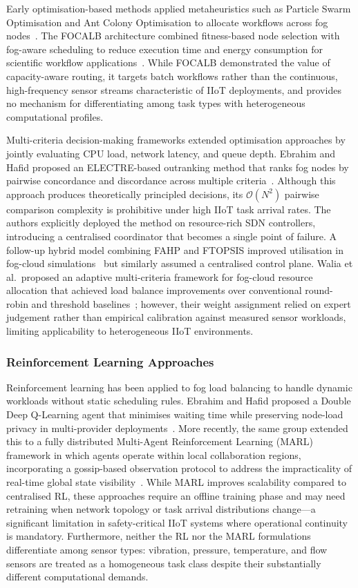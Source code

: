 \documentclass[conference]{IEEEtran}
\begin{document}
Early optimisation-based methods applied metaheuristics such as Particle Swarm Optimisation and Ant Colony Optimisation to allocate workflows across fog nodes~\cite{tripathy2026}. The FOCALB architecture combined fitness-based node selection with fog-aware scheduling to reduce execution time and energy consumption for scientific workflow applications~\cite{kaur2021}. While FOCALB demonstrated the value of capacity-aware routing, it targets batch workflows rather than the continuous, high-frequency sensor streams characteristic of IIoT deployments, and provides no mechanism for differentiating among task types with heterogeneous computational profiles.

Multi-criteria decision-making frameworks extended optimisation approaches by jointly evaluating CPU load, network latency, and queue depth. Ebrahim and Hafid proposed an ELECTRE-based outranking method that ranks fog nodes by pairwise concordance and discordance across multiple criteria~\cite{ebrahim2023b}. Although this approach produces theoretically principled decisions, its $\mathcal{O}(N^2)$ pairwise comparison complexity is prohibitive under high IIoT task arrival rates. The authors explicitly deployed the method on resource-rich SDN controllers, introducing a centralised coordinator that becomes a single point of failure. A follow-up hybrid model combining FAHP and FTOPSIS improved utilisation in fog-cloud simulations~\cite{ahmed2024} but similarly assumed a centralised control plane. Walia et al.\ proposed an adaptive multi-criteria framework for fog-cloud resource allocation that achieved load balance improvements over conventional round-robin and threshold baselines~\cite{walia2024}; however, their weight assignment relied on expert judgement rather than empirical calibration against measured sensor workloads, limiting applicability to heterogeneous IIoT environments.

\subsubsection{Reinforcement Learning Approaches}

Reinforcement learning has been applied to fog load balancing to handle dynamic workloads without static scheduling rules. Ebrahim and Hafid proposed a Double Deep Q-Learning agent that minimises waiting time while preserving node-load privacy in multi-provider deployments~\cite{ebrahim2023a}. More recently, the same group extended this to a fully distributed Multi-Agent Reinforcement Learning (MARL) framework in which agents operate within local collaboration regions, incorporating a gossip-based observation protocol to address the impracticality of real-time global state visibility~\cite{ebrahim2025}. While MARL improves scalability compared to centralised RL, these approaches require an offline training phase and may need retraining when network topology or task arrival distributions change---a significant limitation in safety-critical IIoT systems where operational continuity is mandatory. Furthermore, neither the RL nor the MARL formulations differentiate among sensor types: vibration, pressure, temperature, and flow sensors are treated as a homogeneous task class despite their substantially different computational demands.
\end{document}
